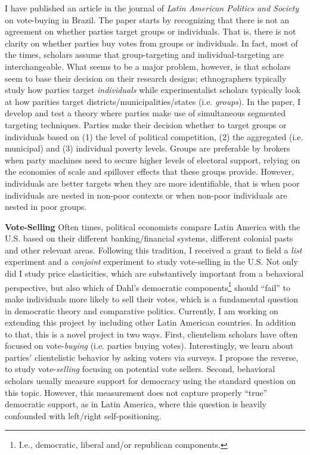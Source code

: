 \documentclass[11pt]{letter} %
\begin{document}
\begin{letter}{}
I have published an article in the journal of \emph{Latin American Politics and Society} on vote-buying in Brazil. The paper starts by recognizing that there is not an agreement on whether parties target groups or individuals. That is, there is not clarity on whether parties buy votes from groups or individuals. In fact, most of the times, scholars assume that group-targeting and individual-targeting are interchangeable. What seems to be a major problem, however, is that scholars seem to base their decision on their research designs; ethnographers typically study how parties target \emph{individuals} while experimentalist scholars typically look at how parities target districts/municipalities/states (i.e. \emph{groups}). In the paper, I develop and test a theory where parties make use of simultaneous segmented targeting techniques. Parties make their decision whether to target groups or individuals based on (1) the level of political competition, (2) the aggregated (i.e. municipal) and  (3) individual poverty levels. Groups are preferable by brokers when party machines need to secure higher levels of electoral support, relying on the economies of scale and spillover effects that these groups provide. However, individuals are better targets when they are more identifiable, that is when poor individuals are nested in non-poor contexts or when non-poor individuals are nested in poor groups.

{\bf Vote-Selling} Often times, political economists compare Latin America with the U.S. based on their different banking/financial systems, different colonial pasts and other relevant areas. Following this tradition, I received a grant to field a \emph{list} experiment and a \emph{conjoint} experiment to study vote-selling in the U.S. Not only did I study price elasticities, which are substantively important from a behavioral perspective, but also which of Dahl's democratic components\footnote{I.e., democratic, liberal and/or republican components.} should ``fail'' to make individuals more likely to sell their votes, which is a fundamental question in democratic theory and comparative politics. Currently, I am working on extending this project by including other Latin American countries. In addition to that, this is a novel project in two ways. First, clientelism scholars have often focused on vote-\emph{buying} (i.e. parties buying votes). Interestingly, we learn about parties' clientelistic behavior by asking voters via surveys. I propose the reverse, to study vote-\emph{selling} focusing on potential vote sellers. Second, behavioral scholars usually measure support for democracy using the standard question on this topic. However, this measurement does not capture properly ``true'' democratic support, as in Latin America, where this question is heavily confounded with left/right self-positioning. 


\end{letter}
\end{document}
